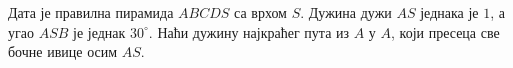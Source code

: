 \problem
Дата је правилна пирамида $ABCDS$ са врхом $S$.
Дужина дужи $AS$ једнака је $1$, а угао $ASB$ је једнак $30^\circ$. 
Наћи дужину најкраћег пута из $A$ у $A$, који пресеца све бочне ивице осим
$AS$.

\solution

\endproblem
